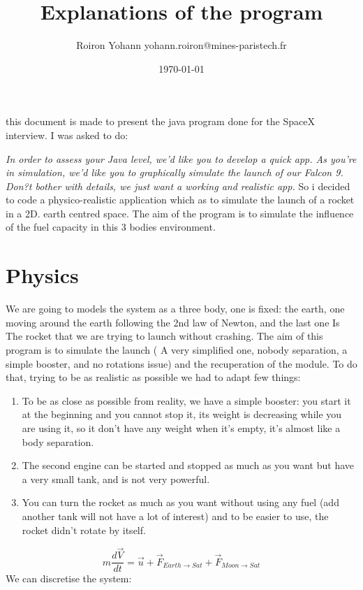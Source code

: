 \documentclass{scrartcl}
\begin{document}
\title{Explanations of the program}
\date{\today{}}

\author{Roiron Yohann yohann.roiron@mines-paristech.fr}

\maketitle


this document is made to present the java program done for the SpaceX interview.
I was asked to do:

\emph{ In order to assess your Java level, we’d like you to develop a quick app. As you’re in simulation, we’d like you to graphically simulate the launch of our Falcon 9. Don?t bother with details, we just want a working and realistic app.}
So i decided to code a physico-realistic application which as to simulate the launch of a rocket in a 2D. earth centred space. The aim of the program is to simulate the influence of the fuel capacity in this 3 bodies environment.

\section{Physics}
We are going to models the system as a three body, one is fixed: the earth, one moving around the earth following the 2nd law of Newton, and the last one Is The rocket that we are trying to launch without crashing. The aim of this program is to simulate the launch ( A very simplified one, nobody separation, a simple booster, and no rotations issue) and the recuperation of the module. To do that, trying to be as realistic as possible we had to adapt few things:
\begin{enumerate}
\item To be as close as possible from reality, we have a simple booster: you start it at the beginning and you cannot stop it, its weight is decreasing while you are using it, so it don't have any weight when it's empty, it's almost like a body separation.
\item The second engine can be started and stopped as much as you want but have a very small tank, and is not very powerful.
\item You can turn the rocket as much as you want without using any fuel (add another tank will not have a lot of interest) and to be easier to use, the rocket didn't rotate by itself.
\end{enumerate}

$$m\frac{d\vec V}{dt}=\vec u+ \vec F_{Earth \rightarrow Sat} + \vec F _{Moon \rightarrow Sat}$$
We can discretise the system:
\end{document}
